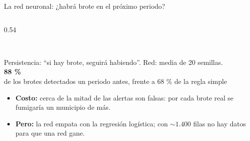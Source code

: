 \documentclass[aspectratio=169,10pt]{beamer}
\newcommand{\cifra}[2]{{\LARGE\bfseries\color{naranja}#1}\\[-3pt]{\footnotesize #2}}
\begin{document}
\begin{frame}{La red neuronal: ¿habrá brote en el próximo periodo?}
\begin{columns}[T]
\begin{column}{0.54\textwidth}
\begin{tabular}{lccc}
        \bottomrule
      \end{tabular}\\[2pt]
      {\tiny Persistencia: ``si hay brote, seguirá habiendo''. Red: media de 20 semillas.}\\[6pt]
      \cifra{88 \%}{de los brotes detectados un periodo antes, frente a 68 \% de la regla simple}
      \begin{itemize}\setlength\itemsep{2pt}\footnotesize\raggedright
        \item \textbf{Costo:} cerca de la mitad de las alertas son falsas: por cada brote real se fumigaría un municipio de más.
        \item \textbf{Pero:} la red \alert{empata} con la regresión logística; con ${\sim}1.400$ filas no hay datos para que una red gane.
      \end{itemize}
    \end{column}
  \end{columns}
\end{frame}
\end{document}
